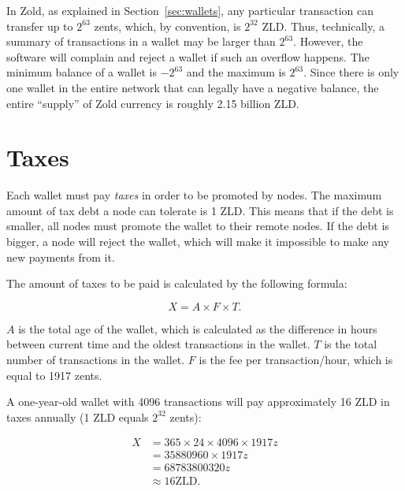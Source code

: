 \documentclass{main}
\begin{document}
In Zold, as explained in Section~\ref{sec:wallets}, any particular transaction can
transfer up to $2^{63}$ zents, which, by convention, is $2^{32}$ ZLD.
Thus, technically, a summary of transactions in a wallet may be larger
than $2^{63}$. However, the software will complain and reject a wallet
if such an overflow happens. The minimum balance of a wallet is $-2^{63}$
and the maximum is $2^{63}$. Since there is only one wallet in the entire
network that can legally have a negative balance, the entire ``supply''
of Zold currency is roughly 2.15 billion ZLD.

\section{Taxes}\label{sec:taxes}

Each wallet must pay \emph{taxes} in order to be promoted by nodes.
The maximum amount of tax debt a node can tolerate is 1 ZLD. This means
that if the debt is smaller, all nodes must promote the wallet to their
remote nodes. If the debt is bigger, a node will reject the wallet,
which will make it impossible to make any new payments from it.

The amount of taxes to be paid is calculated by the following formula:

\begin{equation}
X = A \times F \times T.
\end{equation}

$A$ is the total age of the wallet,
which is calculated as the difference in hours between current time and
the oldest transactions in the wallet.
$T$ is the total number of transactions in the wallet.
$F$ is the fee per transaction/hour, which is equal to 1917 zents.

A one-year-old wallet with 4096 transactions will pay approximately 16 ZLD in taxes annually
(1 ZLD equals $2^{32}$ zents):

\begin{equation}
\begin{split}
X & = 365 \times 24 \times 4096 \times 1917z \\
  & = \text{35880960} \times 1917z \\
  & = \text{68783800320}z \\
  & \approx 16 \text{ZLD}.
\end{split}
\end{equation}
\end{document}
